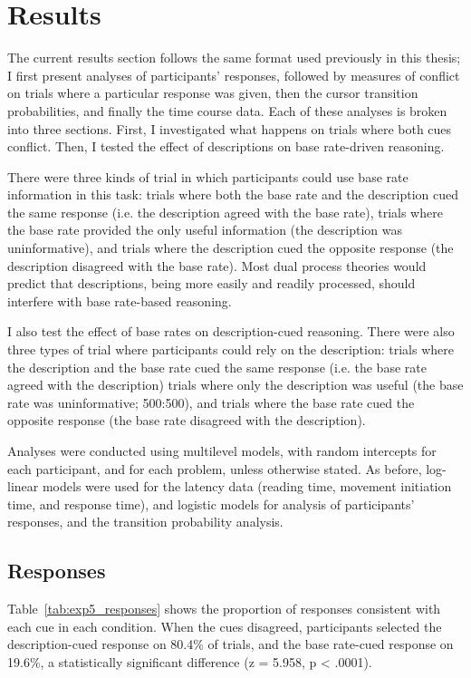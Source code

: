 
\section{Results}

The current results section follows the same
format used previously in this thesis;
I first present analyses of participants' responses,
followed by measures of conflict on trials where a particular response was given,
then the cursor transition probabilities,
and finally the time course data.
Each of these analyses is broken into three sections.
First, I investigated what happens on trials where both cues conflict.
Then, I tested the effect of descriptions on base rate-driven reasoning.

There were three kinds of trial in which
participants could use base rate information in this task:
trials where both the base rate and the description cued the same response
(i.e. the description agreed with the base rate),
trials where the base rate provided the only useful information
(the description was uninformative),
and trials where the description cued the opposite response
(the description disagreed with the base rate).
Most dual process theories would predict that descriptions,
being more easily and readily processed,
should interfere with base rate-based reasoning.

I also test the effect of base rates on description-cued reasoning.
There were also three types of trial where
participants could rely on the description:
trials where the description and the base rate cued the same response
(i.e. the base rate agreed with the description)
trials where only the description was useful
(the base rate was uninformative; 500:500),
and trials where the base rate cued the opposite response
(the base rate disagreed with the description).

Analyses were conducted using multilevel models,
with random intercepts for each participant, and for each problem,
unless otherwise stated.
As before, log-linear models were used for the latency data
(reading time, movement initiation time, and response time),
and logistic models for analysis of participants' responses,
and the transition probability analysis.

\subsection{Responses}

Table~\ref{tab:exp5_responses} shows the proportion of responses
consistent with each cue in each condition.
When the cues disagreed, participants selected
the description-cued response on 80.4\% of trials,
and the base rate-cued response on 19.6\%,
a statistically significant difference (z = 5.958, p < .0001).


